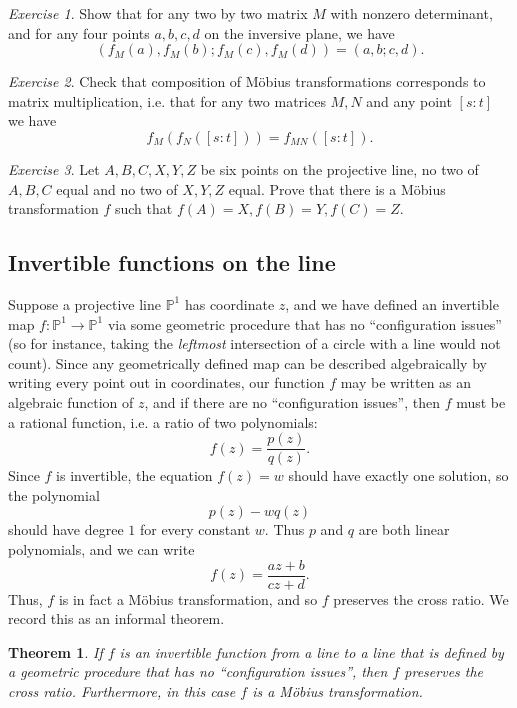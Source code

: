 \documentclass[letterpaper,11pt]{article}
\newtheorem{thm}{Theorem}
\theoremstyle{definition}
\theoremstyle{remark}
\newtheorem{exer}{Exercise}
\begin{document}
\begin{exer} Show that for any two by two matrix $M$ with nonzero determinant, and for any four points $a,b,c,d$ on the inversive plane, we have
\[
(f_M(a),f_M(b);f_M(c),f_M(d)) = (a,b;c,d).
\]
\end{exer}

\begin{exer} Check that composition of M\"obius transformations corresponds to matrix multiplication, i.e. that for any two matrices $M,N$ and any point $[s:t]$ we have
\[
f_M(f_N([s:t])) = f_{MN}([s:t]).
\]
\end{exer}

\begin{exer} Let $A,B,C,X,Y,Z$ be six points on the projective line, no two of $A,B,C$ equal and no two of $X,Y,Z$ equal. Prove that there is a M\"obius transformation $f$ such that $f(A) = X, f(B) = Y, f(C) = Z$.
\end{exer}

\subsection{Invertible functions on the line}

Suppose a projective line $\mathbb{P}^1$ has coordinate $z$, and we have defined an invertible map $f:\mathbb{P}^1 \rightarrow \mathbb{P}^1$ via some geometric procedure that has no ``configuration issues'' (so for instance, taking the \emph{leftmost} intersection of a circle with a line would not count). Since any geometrically defined map can be described algebraically by writing every point out in coordinates, our function $f$ may be written as an algebraic function of $z$, and if there are no ``configuration issues'', then $f$ must be a rational function, i.e. a ratio of two polynomials:
\[
f(z) = \frac{p(z)}{q(z)}.
\]
Since $f$ is invertible, the equation $f(z) = w$ should have exactly one solution, so the polynomial
\[
p(z) - wq(z)
\]
should have degree $1$ for every constant $w$. Thus $p$ and $q$ are both linear polynomials, and we can write
\[
f(z) = \frac{az+b}{cz+d}.
\]
Thus, $f$ is in fact a M\"obius transformation, and so $f$ preserves the cross ratio. We record this as an informal theorem.

\begin{thm}\label{invariant} If $f$ is an invertible function from a line to a line that is defined by a geometric procedure that has no ``configuration issues'', then $f$ preserves the cross ratio. Furthermore, in this case $f$ is a M\"obius transformation.
\end{thm}
\end{document}
